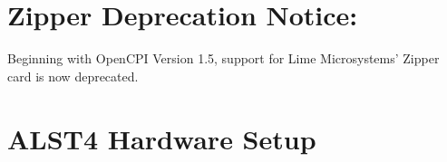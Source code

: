 \iffalse
This file is protected by Copyright. Please refer to the COPYRIGHT file
distributed with this source distribution.

This file is part of OpenCPI <http://www.opencpi.org>

OpenCPI is free software: you can redistribute it and/or modify it under the
terms of the GNU Lesser General Public License as published by the Free Software
Foundation, either version 3 of the License, or (at your option) any later
version.

OpenCPI is distributed in the hope that it will be useful, but WITHOUT ANY
WARRANTY; without even the implied warranty of MERCHANTABILITY or FITNESS FOR A
PARTICULAR PURPOSE. See the GNU Lesser General Public License for more details.

You should have received a copy of the GNU Lesser General Public License along
with this program. If not, see <http://www.gnu.org/licenses/>.
\fi

\def\comp{alst4}
\def\Comp{ALST4}
\def\docTitle{\Comp{} Hardware Setup}
\def\snippetpath{../../../../../../doc/av/tex/snippets}

\graphicspath{{figures/}}
\newcommand{\shellcmd}[1]{\texttt{\$ #1\\}}


\maketitle
\thispagestyle{empty}
\newpage

\section*{Zipper Deprecation Notice:}
Beginning with OpenCPI Version 1.5, support for Lime Microsystems' Zipper card is now deprecated.
\section*{ALST4 Hardware Setup}
